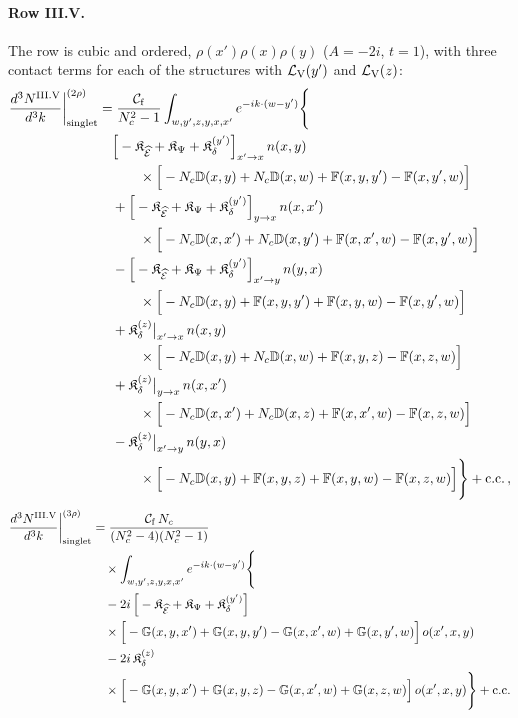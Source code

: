 \paragraph{Row III.V.} The row is cubic and ordered, $\rho(x')\rho(x)\rho(y)$ ($A=-2i$, $t=1$), with three contact terms for each of the structures with $\mathcal L_{\rm V}(y')$ and $\mathcal L_{\rm V}(z)$:
\begin{align}\label{eq:sIIIV}
\frac{d^3N^{\rm III.V}}{d^3k}\bigg|^{(2\rho)}_{\rm singlet}&=\frac{\mathcal C_{\rm f}}{N_c^2-1}\int_{w,y',z,y,x,x'}e^{-ik\cdot(w-y')}\Bigg\{\notag\\
&\quad\Big[-\mathfrak K_{\widehat{\mathcal E}}+\mathfrak K_\Psi+\mathfrak K_\delta^{(y')}\Big]_{x'\to x}\,n(x,y)\notag\\
&\qquad\quad\times\Big[-N_c\mathbb{D}(x,y)+N_c\mathbb{D}(x,w)+\mathbb{F}(x,y,y')-\mathbb{F}(x,y',w)\Big]\notag\\
&\quad+\Big[-\mathfrak K_{\widehat{\mathcal E}}+\mathfrak K_\Psi+\mathfrak K_\delta^{(y')}\Big]_{y\to x}\,n(x,x')\notag\\
&\qquad\quad\times\Big[-N_c\mathbb{D}(x,x')+N_c\mathbb{D}(x,y')+\mathbb{F}(x,x',w)-\mathbb{F}(x,y',w)\Big]\notag\\
&\quad-\Big[-\mathfrak K_{\widehat{\mathcal E}}+\mathfrak K_\Psi+\mathfrak K_\delta^{(y')}\Big]_{x'\to y}\,n(y,x)\notag\\
&\qquad\quad\times\Big[-N_c\mathbb{D}(x,y)+\mathbb{F}(x,y,y')+\mathbb{F}(x,y,w)-\mathbb{F}(x,y',w)\Big]\notag\\
&\quad+\mathfrak K_\delta^{(z)}\big|_{x'\to x}\,n(x,y)\notag\\
&\qquad\quad\times\Big[-N_c\mathbb{D}(x,y)+N_c\mathbb{D}(x,w)+\mathbb{F}(x,y,z)-\mathbb{F}(x,z,w)\Big]\notag\\
&\quad+\mathfrak K_\delta^{(z)}\big|_{y\to x}\,n(x,x')\notag\\
&\qquad\quad\times\Big[-N_c\mathbb{D}(x,x')+N_c\mathbb{D}(x,z)+\mathbb{F}(x,x',w)-\mathbb{F}(x,z,w)\Big]\notag\\
&\quad-\mathfrak K_\delta^{(z)}\big|_{x'\to y}\,n(y,x)\notag\\
&\qquad\quad\times\Big[-N_c\mathbb{D}(x,y)+\mathbb{F}(x,y,z)+\mathbb{F}(x,y,w)-\mathbb{F}(x,z,w)\Big]\Bigg\}+{\rm c.c.}\,,
\end{align}
\begin{align}\label{eq:oIIIV}
\frac{d^3N^{\rm III.V}}{d^3k}\bigg|^{(3\rho)}_{\rm singlet}&=\frac{\mathcal C_{\rm f}\,N_c}{(N_c^2-4)(N_c^2-1)}\notag\\
&\quad\times\int_{w,y',z,y,x,x'}e^{-ik\cdot(w-y')}\Bigg\{\notag\\
&\quad-2i\,\Big[-\mathfrak K_{\widehat{\mathcal E}}+\mathfrak K_\Psi+\mathfrak K_\delta^{(y')}\Big]\notag\\
&\quad\times\Big[-\mathbb{G}(x,y,x')+\mathbb{G}(x,y,y')-\mathbb{G}(x,x',w)+\mathbb{G}(x,y',w)\Big]\,o(x',x,y)\notag\\
&\quad-2i\,\mathfrak K_\delta^{(z)}\notag\\
&\quad\times\Big[-\mathbb{G}(x,y,x')+\mathbb{G}(x,y,z)-\mathbb{G}(x,x',w)+\mathbb{G}(x,z,w)\Big]\,o(x',x,y)\Bigg\}+{\rm c.c.}
\end{align}

